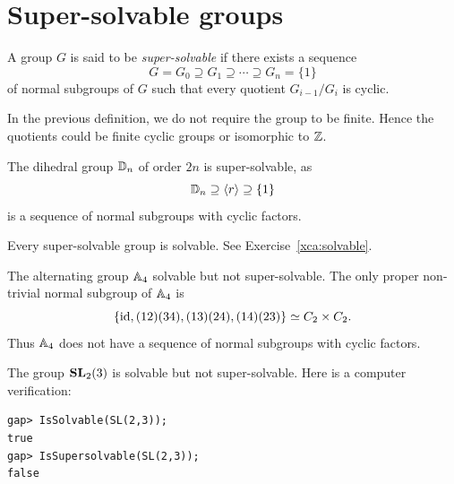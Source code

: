 
\section{Super-solvable groups}

\begin{definition}
A group $G$ is said to be \emph{super-solvable} if there exists a sequence 
\[
G=G_0\supseteq G_1\supseteq\cdots\supseteq G_n=\{1\}
\]
of normal subgroups of $G$ such that every 
quotient $G_{i-1}/G_i$ is cyclic. 
\end{definition}

In the previous definition, we do not require the group to be finite. Hence the quotients 
could be finite cyclic groups or isomorphic to $\mathbb{Z}$. 

\begin{example}
The dihedral group $\mathbb{D}_{n}$ of order $2n$ is super-solvable, as 
\[	
\mathbb{D}_{n}\supseteq \langle
r\rangle\supseteq \{1\}
\]
is a sequence of normal subgroups with cyclic factors. 
\end{example}

Every super-solvable group is solvable. See Exercise~\ref{xca:solvable}.

\begin{example}
The alternating group $\mathbb{A}_4$ solvable but not super-solvable. The only 
proper non-trivial normal subgroup of $\mathbb{A}_4$ is 
	\[
	\{\operatorname{id},(12)(34),(13)(24),(14)(23)\}\simeq C_2\times C_2.
	\]
Thus $\mathbb{A}_4$ does not have a sequence of normal subgroups 
with cyclic factors. 
\end{example}


\begin{example}
The group $\mathbf{SL}_2(3)$ is solvable but not super-solvable. Here is a computer verification: 
\begin{lstlisting}
gap> IsSolvable(SL(2,3));
true
gap> IsSupersolvable(SL(2,3));
false
\end{lstlisting}
\end{example}


